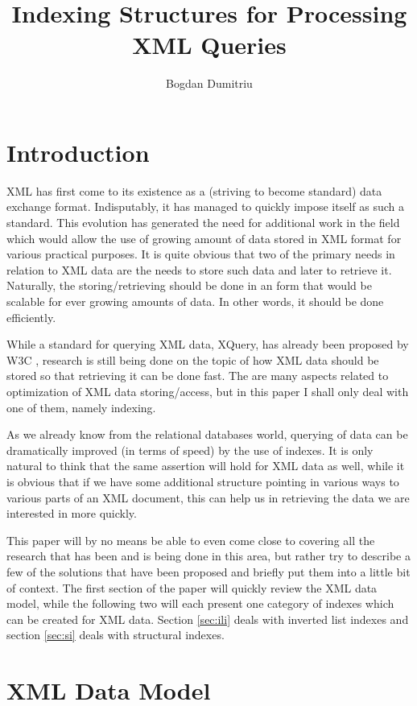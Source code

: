 \documentclass[a4paper,10pt]{article}
\title{Indexing Structures for Processing XML Queries}
\author{Bogdan Dumitriu}
\begin{document}
\maketitle

\section{Introduction}

XML has first come to its existence as a (striving to become standard) data exchange
format. Indisputably, it has managed to quickly impose itself as such a standard. This
evolution has generated the need for additional work in the field which would allow
the use of growing amount of data stored in XML format for various practical purposes.
It is quite obvious that two of the primary needs in relation to XML data are the needs
to store such data and later to retrieve it. Naturally, the storing/retrieving should be done
in an form that would be scalable for ever growing amounts of data. In other words, it
should be done efficiently.

While a standard for querying XML data, XQuery, has already been proposed by W3C
\cite{w3cxq}, research is still being done on the topic of how XML data should be
stored so that retrieving it can be done fast. The are many aspects related to optimization
of XML data storing/access, but in this paper I shall only deal with one of them, namely
indexing.

As we already know from the relational databases world, querying of data can be dramatically
improved (in terms of speed) by the use of indexes. It is only natural to think that the
same assertion will hold for XML data as well, while it is obvious that if we have some
additional structure pointing in various ways to various parts of an XML document, this
can help us in retrieving the data we are interested in more quickly.

This paper will by no means be able to even come close to covering all the research that
has been and is being done in this area, but rather try to describe a few of the solutions
that have been proposed and briefly put them into a little bit of context. The first section
of the paper will quickly review the XML data model, while the following two will each
present one category of indexes which can be created for XML data. Section \ref{sec:ili}
deals with inverted list indexes and section \ref{sec:si} deals with structural indexes.

\section{XML Data Model}
\end{document}
